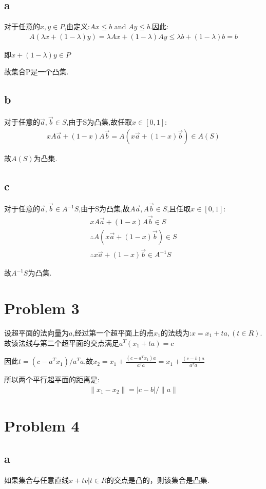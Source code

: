 \documentclass[12pt,a4paper,fontset=none]{ctexart}
\begin{document}
\subsection*{a}
对于任意的$x,y\in P$,由定义:$Ax\leq b$ and $Ay\leq b$.因此:
\begin{align*}
    A(\lambda x+(1-\lambda)y)=\lambda Ax+(1-\lambda)Ay\leq \lambda b+(1-\lambda)b=b
\end{align*}

即$x+(1-\lambda)y\in P$

故集合P是一个凸集.
\subsection*{b}
对于任意的$\vec{a},\vec{b}\in S$,由于S为凸集,故任取$x\in [0,1]:$\begin{align*}
    xA\vec{a}+(1-x)A\vec{b}=A(x\vec{a}+(1-x)\vec{b})\in A(S)
\end{align*}

故$A(S)$为凸集.
\subsection*{c}
对于任意的$\vec{a},\vec{b}\in A^{-1}S$,由于S为凸集,故$A\vec{a},A\vec{b}\in S$,且任取$x\in [0,1]:
$\begin{align*}
    xA\vec{a}+(1-x)A\vec{b}\in S             \\
    \therefore A(x\vec{a}+(1-x)\vec{b})\in S \\
    \therefore x\vec{a}+(1-x)\vec{b}\in A^{-1}S
\end{align*}

故$A^{-1}S$为凸集.
\section*{Problem 3}
设超平面的法向量为$a$,经过第一个超平面上的点$x_1$的法线为:$x=x_1+ta,(t\in R)$.故该法线与第二个超平面的交点满足$a^T(x_1+ta)=c$

因此$t=(c-a^Tx_1)/a^Ta$,故$x_2=x_1+\frac{(c-a^Tx_1)a}{a^Ta}=x_1+\frac{(c-b)a}{a^Ta}$

所以两个平行超平面的距离是:
\begin{align*}
    \|x_1-x_2\|=|c-b|/\|a\|
\end{align*}
\section*{Problem 4}
\subsection*{a}
如果集合与任意直线${\hat{x}+tv|t\in R}$的交点是凸的，则该集合是凸集.
\end{document}
